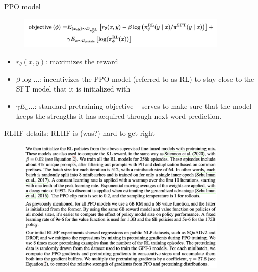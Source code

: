 \begin{vbframe}{PPO model}


\begin{figure}
\centering
\includegraphics[width = 10cm]{figure/objectiveppo.png}
\end{figure}


\begin{itemize}
\item $r_\theta(x,y)$: maximizes the reward
  \item $\beta \log \ldots$: incentivizes the PPO model
    (referred to as RL) to stay close to the SFT model that
    it is initialized with 
    \item $\gamma E_x \ldots$: standard
      pretraining objective -- serves to make sure
      that the model keeps the strengths it has acquired
      through next-word prediction.
\end{itemize}



\vfill

\end{vbframe}


\begin{vbframe}{RLHF details: RLHF is (was?) hard to get right}


\begin{figure}
\centering
\includegraphics[width = 10cm]{figure/rlhfdetails.png}
\end{figure}



\vfill

\end{vbframe}




